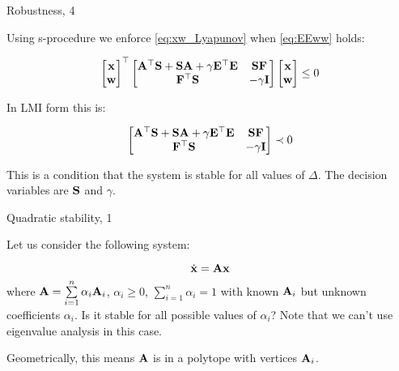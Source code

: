 \documentclass{beamer}
\begin{document}
\begin{frame}{Robustness, 4}
	\begin{flushleft}
		
		
		Using s-procedure we enforce \eqref{eq:xw_Lyapunov} when \eqref{eq:EEww} holds:
		
		\begin{equation}
			\begin{bmatrix}
				\mathbf{x} \\ \mathbf{w}
			\end{bmatrix}^\top
			\begin{bmatrix}
				\mathbf{A}^\top \mathbf{S} + \mathbf{S}\mathbf{A} + \gamma \mathbf{E}^\top \mathbf{E} & \mathbf{S}\mathbf{F} \\
				\mathbf{F}^\top\mathbf{S} & -\gamma\mathbf{I}
			\end{bmatrix}		
			\begin{bmatrix}
				\mathbf{x} \\ \mathbf{w}
			\end{bmatrix}
			\leq 0
		\end{equation}
	
	In LMI form this is:
	
		\begin{equation}
	\begin{bmatrix}
		\mathbf{A}^\top \mathbf{S} + \mathbf{S}\mathbf{A} + \gamma \mathbf{E}^\top \mathbf{E} & \mathbf{S}\mathbf{F} \\
		\mathbf{F}^\top\mathbf{S} & -\gamma\mathbf{I}
	\end{bmatrix}		
	\prec 0
\end{equation}	
		
			
	This is a condition that the system is stable for all values of $\Delta$. The decision variables are $\mathbf{S}$ and $\gamma$.		
		
	\end{flushleft}
\end{frame}





\begin{frame}{Quadratic stability, 1}
	\begin{flushleft}
		
		Let us consider the following system:
		
		\begin{equation}
			\dot{\mathbf{x}} = \mathbf{A}\mathbf{x}
		\end{equation}
		where $\mathbf{A} = \sum\limits_{i=1}^{n} \alpha_i \mathbf{A}_i$, $\alpha_i \geq 0$, $\sum\limits_{i=1}^{n} \alpha_i = 1$ with known $\mathbf{A}_i$ but unknown coefficients $\alpha_i$. Is it stable for all possible values of $\alpha_i$? Note that we can't use eigenvalue analysis in this case.
		
		\bigskip
		
		Geometrically, this means $\mathbf{A}$ is in a polytope with vertices $\mathbf{A}_i$.
		
	\end{flushleft}
\end{frame}
\end{document}
